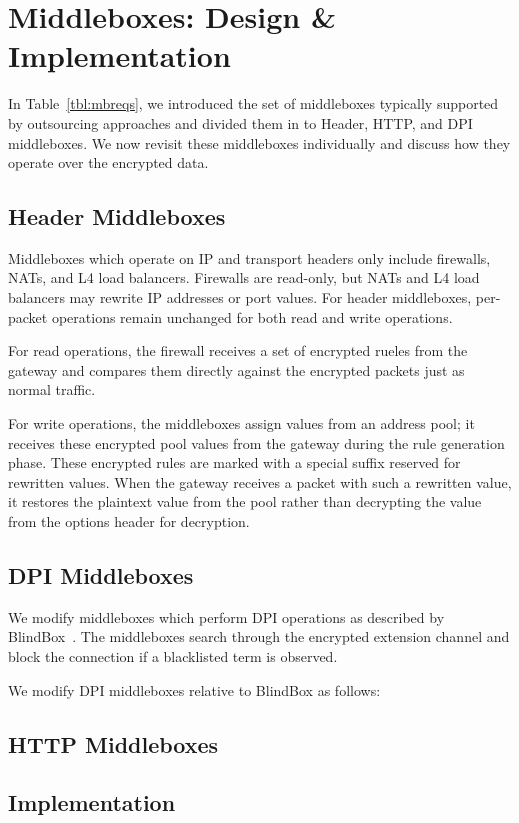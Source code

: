 \section{Middleboxes: Design \& Implementation}
\label{sec:mbs}

In Table~\ref{tbl:mbreqs}, we introduced the set of middleboxes typically supported by outsourcing approaches and divided them in to Header, HTTP, and DPI middleboxes. 
We now revisit these middleboxes individually and discuss how they operate over the encrypted data.


\subsection{Header Middleboxes}
Middleboxes which operate on IP and transport headers only include firewalls, NATs, and L4 load balancers.
Firewalls are read-only, but NATs and L4 load balancers may rewrite IP addresses or port values. 
For header middleboxes, per-packet operations remain unchanged for both read and write operations.

For read operations, the firewall receives a set of encrypted rueles from the gateway and compares them directly against the encrypted packets just as normal traffic.

For write operations, the middleboxes assign values from an address pool; it receives these encrypted pool values from the gateway during the rule generation phase.
These encrypted rules are marked with a special suffix reserved for rewritten values.
When the gateway receives a packet with such a rewritten value, it restores the plaintext value from the pool rather than decrypting the value from the options header for decryption.

\subsection{DPI Middleboxes}
We modify middleboxes which perform DPI operations as described by BlindBox~\cite{blindbox}.
The middleboxes search through the encrypted extension channel and block the connection if a blacklisted term is observed.

We modify DPI middleboxes relative to BlindBox as follows:



\subsection{HTTP Middleboxes}

\subsection{Implementation}

